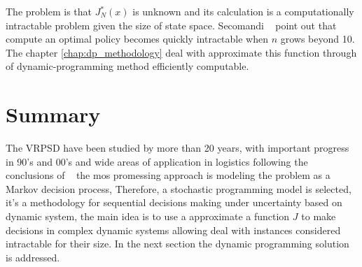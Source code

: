 The problem is that $J_N^*(x)$ is unknown and its calculation is a computationally intractable problem given the size of state space. Secomandi ~\cite{secomandi_rollout_2001} point out that compute an optimal policy becomes quickly intractable when $n$ grows beyond 10. The chapter \ref{chap:dp_methodology} deal with approximate this function through of dynamic-programming method efficiently computable.

\section{Summary}

The VRPSD have been studied by more than 20 years, with important progress in 90's and 00's and wide areas of application in logistics following the conclusions of ~\cite{Dror_2005} the mos promessing approach is modeling the problem as a Markov decision process, Therefore, a stochastic programming model is selected, it's a methodology for sequential decisions making under uncertainty based on dynamic system, the main idea is to use a approximate a function $J$ to make decisions in complex dynamic systems allowing deal with instances considered intractable for their size. In the next section the dynamic programming solution is addressed.